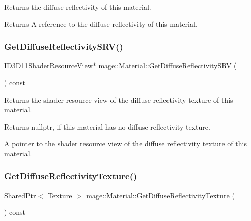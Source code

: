 Returns the diffuse reflectivity of this material.

\begin{DoxyReturn}{Returns}
A reference to the diffuse reflectivity of this material. 
\end{DoxyReturn}
\hypertarget{structmage_1_1_material_a20c4db65d5fb89178c0f6b6db2f87cda}{}\label{structmage_1_1_material_a20c4db65d5fb89178c0f6b6db2f87cda} 
\subsubsection{\texorpdfstring{Get\+Diffuse\+Reflectivity\+S\+R\+V()}{GetDiffuseReflectivitySRV()}}
{\footnotesize\ttfamily I\+D3\+D11\+Shader\+Resource\+View$\ast$ mage\+::\+Material\+::\+Get\+Diffuse\+Reflectivity\+S\+RV (\begin{DoxyParamCaption}{ }\end{DoxyParamCaption}) const\hspace{0.3cm}{\ttfamily [noexcept]}}

Returns the shader resource view of the diffuse reflectivity texture of this material.

\begin{DoxyReturn}{Returns}
{\ttfamily nullptr}, if this material has no diffuse reflectivity texture. 

A pointer to the shader resource view of the diffuse reflectivity texture of this material. 
\end{DoxyReturn}
\hypertarget{structmage_1_1_material_a3b4de7dc988c91eb3ce7ea715d98b758}{}\label{structmage_1_1_material_a3b4de7dc988c91eb3ce7ea715d98b758} 
\subsubsection{\texorpdfstring{Get\+Diffuse\+Reflectivity\+Texture()}{GetDiffuseReflectivityTexture()}}
{\footnotesize\ttfamily \hyperlink{namespacemage_a1e01ae66713838a7a67d30e44c67703e}{Shared\+Ptr}$<$ \hyperlink{classmage_1_1_texture}{Texture} $>$ mage\+::\+Material\+::\+Get\+Diffuse\+Reflectivity\+Texture (\begin{DoxyParamCaption}{ }\end{DoxyParamCaption}) const\hspace{0.3cm}{\ttfamily [noexcept]}}

